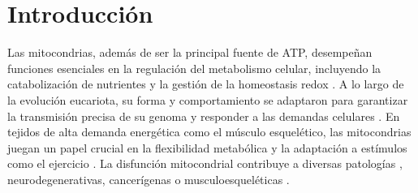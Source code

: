 \section{Introducción}

Las mitocondrias, además de ser la principal fuente de ATP, desempeñan funciones esenciales en la regulación del metabolismo celular, incluyendo la catabolización de nutrientes y la gestión de la homeostasis redox \cite{Spinelli2018}. A lo largo de la evolución eucariota, su forma y comportamiento se adaptaron para garantizar la transmisión precisa de su genoma y responder a las demandas celulares \cite{Friedman2014}. En tejidos de alta demanda energética como el músculo esquelético, las mitocondrias juegan un papel crucial en la flexibilidad metabólica y la adaptación a estímulos como el ejercicio \cite{Memme2021, Smith2023}. La disfunción mitocondrial contribuye a diversas patologías \cite{QuintanaCabrera2023}, neurodegenerativas, cancerígenas \cite{Chan2020} o musculoesqueléticas \cite{Liu2017}.
